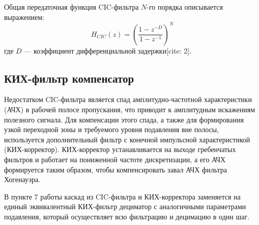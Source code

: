 Общая передаточная функция CIC-фильтра $N$-го порядка описывается выражением:
\begin{equation}
    H_{CIC}(z) = \left( \frac{1 - z^{-D}}{1 - z^{-1}} \right)^N
\end{equation}
где $D$ — коэффициент дифференциальной задержки[cite: 2].

\subsection{КИХ-фильтр компенсатор}
Недостатком CIC-фильтра является спад амплитудно-частотной характеристики (АЧХ) в рабочей полосе пропускания, что приводит к амплитудным искажениям полезного сигнала. Для компенсации этого спада, а также для формирования узкой переходной зоны и требуемого уровня подавления вне полосы, используется дополнительный фильтр с конечной импульсной характеристикой (КИХ-корректор). 
КИХ-корректор устанавливается на выходе гребенчатых фильтров и работает на пониженной частоте дискретизации, а его АЧХ формируется таким образом, чтобы компенсировать завал АЧХ фильтра Хогенауэра. 

В пункте 7 работы каскад из CIC-фильтра и КИХ-корректора заменяется на единый эквивалентный КИХ-фильтр дециматор с аналогичными параметрами подавления, который осуществляет всю фильтрацию и децимацию в один шаг.